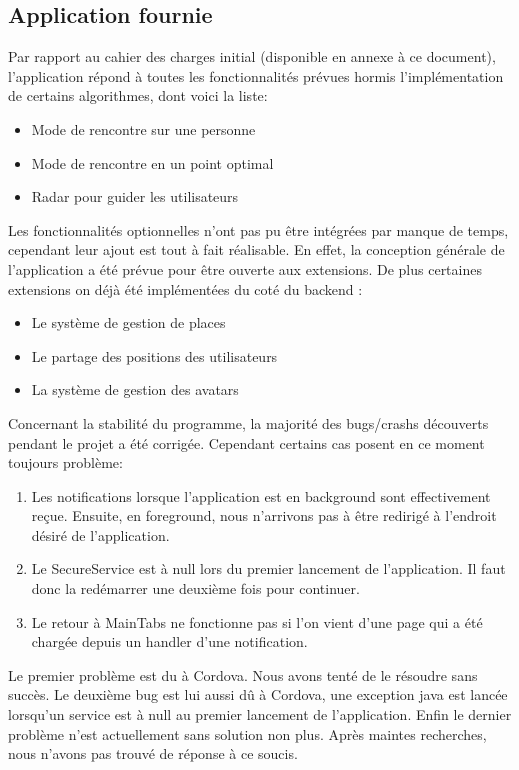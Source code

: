 \documentclass[french]{article}
\begin{document}
		\subsection{Application fournie}			
		Par rapport au cahier des charges initial (disponible en annexe à ce document), l'application répond à toutes les fonctionnalités prévues hormis l'implémentation de certains algorithmes, dont voici la liste:
		\begin{itemize}
			\item Mode de rencontre sur une personne
			\item Mode de rencontre en un point optimal
			\item Radar pour guider les utilisateurs
		\end{itemize}
		Les fonctionnalités optionnelles n'ont pas pu être intégrées par manque de temps, cependant leur ajout est tout à fait réalisable. En effet, la conception générale de l'application a été prévue pour être ouverte aux extensions. De plus certaines extensions on déjà été implémentées du coté du backend : 
		\begin{itemize}
			\item Le système de gestion de places
			\item Le partage des positions des utilisateurs
			\item La système de gestion des avatars
		\end{itemize}
		
		Concernant la stabilité du programme, la majorité des bugs/crashs découverts pendant le projet a été corrigée. Cependant certains cas posent en ce moment toujours problème:
		\begin{enumerate}
			\item Les notifications lorsque l'application est en background sont effectivement reçue. Ensuite, en foreground, nous n'arrivons pas à être redirigé à l'endroit désiré de l'application.
			\item Le SecureService est à null lors du premier lancement de l'application. Il faut donc la redémarrer une deuxième fois pour continuer.
			\item Le retour à MainTabs ne fonctionne pas si l'on vient d'une page qui a été chargée depuis un handler d'une notification.
		\end{enumerate}
		Le premier problème est du à Cordova. Nous avons tenté de le résoudre  sans succès.
		Le deuxième bug est lui aussi dû à Cordova, une exception java est lancée lorsqu'un service est à null au premier lancement de l'application.
		Enfin le dernier problème n'est actuellement sans solution non plus. Après maintes recherches, nous n'avons pas trouvé de réponse à ce soucis.
		
\end{document}
